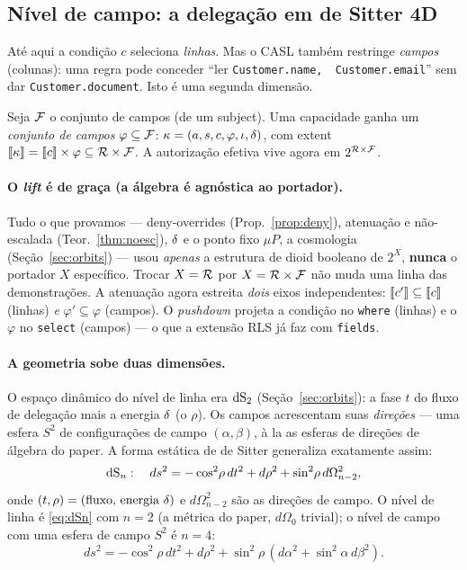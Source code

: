 \subsection{Nível de campo: a delegação em de Sitter 4D}\label{sec:field}

Até aqui a condição $c$ seleciona \emph{linhas}. Mas o CASL também restringe
\emph{campos} (colunas): uma regra pode conceder ``ler \texttt{Customer.name,
\,Customer.email}'' sem dar \texttt{Customer.document}. Isto é uma segunda
dimensão.

\begin{definition}
Seja $\mathcal{F}$ o conjunto de campos (de um subject). Uma capacidade ganha um
\emph{conjunto de campos} $\varphi\subseteq\mathcal{F}$:
$\kappa=(a,s,c,\varphi,\iota,\delta)$, com extent
$\llbracket \kappa \rrbracket=\llbracket c \rrbracket\times\varphi\subseteq\mathcal{R}\times\mathcal{F}$. A autorização efetiva
vive agora em $2^{\mathcal{R}\times\mathcal{F}}$.
\end{definition}

\paragraph{O \emph{lift} é de graça (a álgebra é agnóstica ao portador).} Tudo
o que provamos --- deny-overrides (Prop.~\ref{prop:deny}), atenuação e
não-escalada (Teor.~\ref{thm:noesc}), $\delta$ e o ponto fixo $\mu P$, a
cosmologia (Seção~\ref{sec:orbits}) --- usou \emph{apenas} a estrutura de
dioid booleano de $2^{X}$, \textbf{nunca} o portador $X$ específico. Trocar
$X=\mathcal{R}$ por $X=\mathcal{R}\times\mathcal{F}$ não muda uma linha das demonstrações. A atenuação
agora estreita \emph{dois} eixos independentes: $\llbracket c' \rrbracket\subseteq\llbracket c \rrbracket$
(linhas) \emph{e} $\varphi'\subseteq\varphi$ (campos). O \emph{pushdown}
projeta a condição no \texttt{where} (linhas) e o $\varphi$ no \texttt{select}
(campos) --- o que a extensão RLS já faz com \texttt{fields}.

\paragraph{A geometria sobe duas dimensões.} O espaço dinâmico do nível de
linha era $\mathrm{dS}_2$ (Seção~\ref{sec:orbits}): a fase $t$ do fluxo de delegação
mais a energia $\delta$ (o $\rho$). Os campos acrescentam suas \emph{direções}
--- uma esfera $S^2$ de configurações de campo $(\alpha,\beta)$, à la as
esferas de direções de álgebra do paper. A forma estática de de Sitter
generaliza exatamente assim:
\begin{equation}
  \mathrm{dS}_n:\quad ds^2=-\cos^2\!\rho\,dt^2+d\rho^2+\sin^2\!\rho\,d\Omega^2_{n-2},
  \label{eq:dSn}
\end{equation}
onde $(t,\rho)=(\text{fluxo, energia }\delta)$ e $d\Omega^2_{n-2}$ são as
direções de campo. O nível de linha é \eqref{eq:dSn} com $n=2$ (a métrica do
paper, $d\Omega_0$ trivial); o nível de campo com uma esfera de campo $S^2$ é
$n=4$:
\[
  ds^2=-\cos^2\!\rho\,dt^2+d\rho^2+\sin^2\!\rho\,(d\alpha^2+\sin^2\!\alpha\,d\beta^2).
\]

